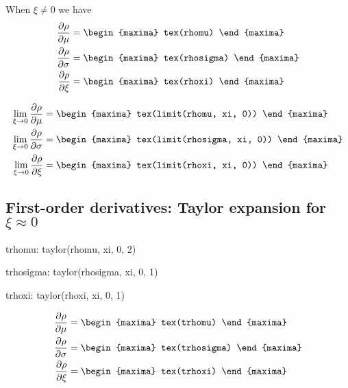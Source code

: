 When $\xi \neq 0$ we have
{\color{MonVertF}
\begin{align*}
\frac{\partial \rho}{\partial \mu} &=
\begin{maxima}
 tex(rhomu)
\end{maxima}
\\
\frac{\partial \rho}{\partial \sigma}  &=
\begin{maxima}
 tex(rhosigma)
\end{maxima}
\\
\frac{\partial \rho}{\partial \xi} &=
\begin{maxima}
 tex(rhoxi)
\end{maxima}
\end{align*}
}

{\color{MonVertF}
\begin{align*}
\lim_{\xi \to 0} \frac{\partial \rho}{\partial \mu} &= 
\begin{maxima}
 tex(limit(rhomu, xi, 0))
\end{maxima}
\\
\lim_{\xi \to 0} \frac{\partial \rho}{\partial \sigma} &= 
\begin{maxima}
 tex(limit(rhosigma, xi, 0))
\end{maxima}
\\
\lim_{\xi \to 0} \frac{\partial \rho}{\partial \xi} &= 
\begin{maxima}
 tex(limit(rhoxi, xi, 0))
\end{maxima}
\end{align*}
}

\subsection{First-order derivatives: Taylor expansion for $\xi \approx 0$}
{\color{MonVertF}
\begin{maxima}
  trhomu: taylor(rhomu, xi, 0, 2)
\end{maxima}
\begin{maxima}
  trhosigma: taylor(rhosigma, xi, 0, 1)
\end{maxima}
\begin{maxima}
  trhoxi: taylor(rhoxi, xi, 0, 1)
\end{maxima}
}

{\color{MonVertF}
\begin{align*}
  \frac{\partial \rho}{\partial \mu}
  &=
  \begin{maxima}
    tex(trhomu)
  \end{maxima} \\
  \frac{\partial \rho}{\partial \sigma}
  &=
  \begin{maxima}
    tex(trhosigma)
  \end{maxima} \\
  \frac{\partial \rho}{\partial \xi}
  &=
  \begin{maxima}
    tex(trhoxi)
  \end{maxima}
\end{align*}
}

